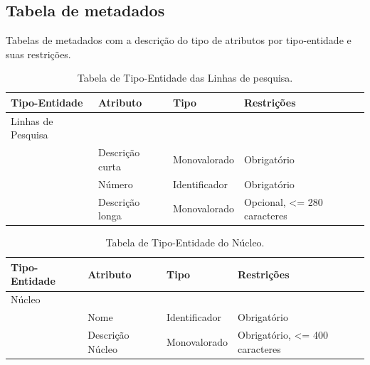 \documentclass[11pt]{../../classes/ifscarticle}
\begin{document}
\subsection{Tabela de metadados}
Tabelas de metadados com a descrição do tipo
de atributos por tipo-entidade e suas restrições.

\begin{table}[h]
    \centering
    \vspace{0.5cm}
    \begin{tabular}{ |p{}|p{3cm}|p{4cm}|p{}|  }
        Tipo-Entidade & Atributo        & Tipo          & Restrições                                       \\ %

        \hline
        Linhas \linebreak de Pesquisa
                      &                 &               &                                                  \\
                      & Descrição curta & Monovalorado  & Obrigatório                        \linebreak    \\
                      & Número          & Identificador & Obrigatório                         \linebreak   \\
                      & Descrição longa & Monovalorado  & Opcional, <= 280 caracteres           \linebreak \\
        \hline
    \end{tabular}
    \caption{Tabela de Tipo-Entidade das Linhas de pesquisa.}
\end{table}


\begin{table}[h]
    \centering
    \vspace{0.5cm}
    \begin{tabular}{ |p{}|p{3cm}|p{4cm}|p{}|  }
        Tipo-Entidade & Atributo         & Tipo          & Restrições                                \\ %

        \hline
        Núcleo        &                  &               &                                           \\
                      & Nome             & Identificador & Obrigatório        \linebreak             \\
                      & Descrição Núcleo & Monovalorado  & Obrigatório, <= 400 caracteres \linebreak \\

        \hline
    \end{tabular}
    \caption{Tabela de Tipo-Entidade do Núcleo.}
\end{table}
\end{document}
